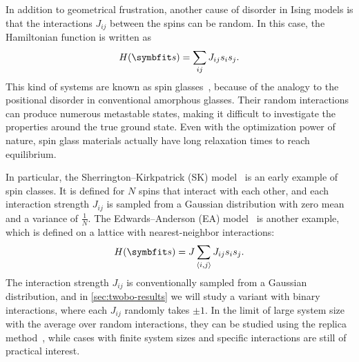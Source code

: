 In addition to geometrical frustration, another cause of disorder in Ising models is that the interactions $J_{i j}$ between the spins can be random. In this case, the Hamiltonian function is written as
\begin{equation}
H(\vs) = \sum_{i j} J_{i j} s_i s_j.
\label{eq:cl-ising-general}
\end{equation}
This kind of systems are known as spin glasses~\cite{fischer1993spin, nishimori2001statistical}, because of the analogy to the positional disorder in conventional amorphous glasses. Their random interactions can produce numerous metastable states, making it difficult to investigate the properties around the true ground state. Even with the optimization power of nature, spin glass materials actually have long relaxation times to reach equilibrium.

In particular, the Sherrington--Kirkpatrick (SK) model~\cite{sherrington1975solvable} is an early example of spin classes. It is defined for $N$ spins that interact with each other, and each interaction strength $J_{i j}$ is sampled from a Gaussian distribution with zero mean and a variance of $\frac{1}{N}$. The Edwards--Anderson (EA) model~\cite{edwards1975theory} is another example, which is defined on a lattice with nearest-neighbor interactions:
\begin{equation}
H(\vs) = J \sum_{\langle i, j \rangle} J_{i j} s_i s_j.
\end{equation}
The interaction strength $J_{i j}$ is conventionally sampled from a Gaussian distribution, and in \cref{sec:twobo-results} we will study a variant with binary interactions, where each $J_{i j}$ randomly takes $\pm 1$. In the limit of large system size with the average over random interactions, they can be studied using the replica method~\cite{parisi1979infinite}, while cases with finite system sizes and specific interactions are still of practical interest.

